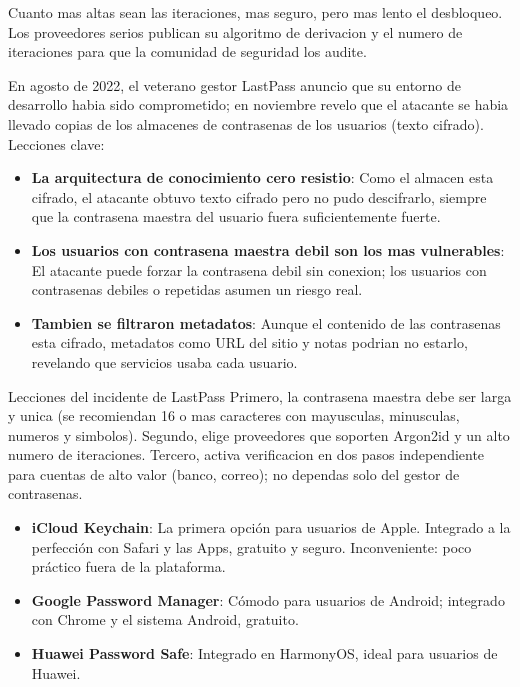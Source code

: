 Cuanto mas altas sean las iteraciones, mas seguro, pero mas lento el desbloqueo. Los proveedores serios publican su algoritmo de derivacion y el numero de iteraciones para que la comunidad de seguridad los audite.


En agosto de 2022, el veterano gestor LastPass anuncio que su entorno de desarrollo habia sido comprometido; en noviembre revelo que el atacante se habia llevado copias de los almacenes de contrasenas de los usuarios (texto cifrado). Lecciones clave:

\begin{itemize}
  \item \textbf{La arquitectura de conocimiento cero resistio}: Como el almacen esta cifrado, el atacante obtuvo texto cifrado pero no pudo descifrarlo, siempre que la contrasena maestra del usuario fuera suficientemente fuerte.
  \item \textbf{Los usuarios con contrasena maestra debil son los mas vulnerables}: El atacante puede forzar la contrasena debil sin conexion; los usuarios con contrasenas debiles o repetidas asumen un riesgo real.
  \item \textbf{Tambien se filtraron metadatos}: Aunque el contenido de las contrasenas esta cifrado, metadatos como URL del sitio y notas podrian no estarlo, revelando que servicios usaba cada usuario.
\end{itemize}

\begin{tcbwarn}{Lecciones del incidente de LastPass}
Primero, la contrasena maestra debe ser larga y unica (se recomiendan 16 o mas caracteres con mayusculas, minusculas, numeros y simbolos). Segundo, elige proveedores que soporten Argon2id y un alto numero de iteraciones. Tercero, activa verificacion en dos pasos independiente para cuentas de alto valor (banco, correo); no dependas solo del gestor de contrasenas.

\end{tcbwarn}



\begin{itemize}
  \item \textbf{iCloud Keychain}: La primera opción para usuarios de Apple. Integrado a la perfección con Safari y las Apps, gratuito y seguro. Inconveniente: poco práctico fuera de la plataforma.
  \item \textbf{Google Password Manager}: Cómodo para usuarios de Android; integrado con Chrome y el sistema Android, gratuito.
  \item \textbf{Huawei Password Safe}: Integrado en HarmonyOS, ideal para usuarios de Huawei.
\end{itemize}

